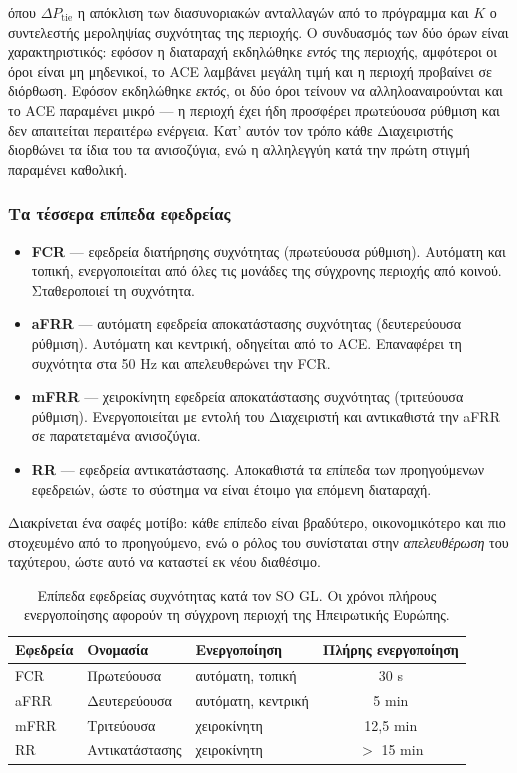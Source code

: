 όπου $\Delta P_{\mathrm{tie}}$ η απόκλιση των διασυνοριακών ανταλλαγών από το πρόγραμμα και
$K$ ο συντελεστής μεροληψίας συχνότητας της περιοχής. Ο συνδυασμός των δύο όρων είναι
χαρακτηριστικός: εφόσον η διαταραχή εκδηλώθηκε \emph{εντός} της περιοχής, αμφότεροι οι όροι
είναι μη μηδενικοί, το ACE λαμβάνει μεγάλη τιμή και η περιοχή προβαίνει σε διόρθωση.
Εφόσον εκδηλώθηκε \emph{εκτός}, οι δύο όροι τείνουν να αλληλοαναιρούνται και το ACE
παραμένει μικρό — η περιοχή έχει ήδη προσφέρει πρωτεύουσα ρύθμιση και δεν απαιτείται
περαιτέρω ενέργεια. Κατ' αυτόν τον τρόπο κάθε Διαχειριστής διορθώνει τα ίδια του τα
ανισοζύγια, ενώ η αλληλεγγύη κατά την πρώτη στιγμή παραμένει καθολική.

\subsubsection*{Τα τέσσερα επίπεδα εφεδρείας}

\begin{itemize}
\item \textbf{FCR} --- εφεδρεία διατήρησης συχνότητας (πρωτεύουσα ρύθμιση). Αυτόματη και
      τοπική, ενεργοποιείται από όλες τις μονάδες της σύγχρονης περιοχής από κοινού.
      Σταθεροποιεί τη συχνότητα.
\item \textbf{aFRR} --- αυτόματη εφεδρεία αποκατάστασης συχνότητας (δευτερεύουσα ρύθμιση).
      Αυτόματη και κεντρική, οδηγείται από το ACE. Επαναφέρει τη συχνότητα στα 50 Hz και
      απελευθερώνει την FCR.
\item \textbf{mFRR} --- χειροκίνητη εφεδρεία αποκατάστασης συχνότητας (τριτεύουσα ρύθμιση).
      Ενεργοποιείται με εντολή του Διαχειριστή και αντικαθιστά την aFRR σε παρατεταμένα
      ανισοζύγια.
\item \textbf{RR} --- εφεδρεία αντικατάστασης. Αποκαθιστά τα επίπεδα των προηγούμενων
      εφεδρειών, ώστε το σύστημα να είναι έτοιμο για επόμενη διαταραχή.
\end{itemize}

Διακρίνεται ένα σαφές μοτίβο: κάθε επίπεδο είναι βραδύτερο, οικονομικότερο και πιο
στοχευμένο από το προηγούμενο, ενώ ο ρόλος του συνίσταται στην \emph{απελευθέρωση} του
ταχύτερου, ώστε αυτό να καταστεί εκ νέου διαθέσιμο.

\begin{table}[!htbp]
\centering
\begin{tabular}{lllc}
\hline
Εφεδρεία & Ονομασία & Ενεργοποίηση & Πλήρης ενεργοποίηση \\
\hline
FCR  & Πρωτεύουσα   & αυτόματη, τοπική  & 30 s \\
aFRR & Δευτερεύουσα & αυτόματη, κεντρική & 5 min \\
mFRR & Τριτεύουσα   & χειροκίνητη        & 12,5 min \\
RR   & Αντικατάστασης & χειροκίνητη      & $>$ 15 min \\
\hline
\end{tabular}
\caption{Επίπεδα εφεδρείας συχνότητας κατά τον SO GL. Οι χρόνοι πλήρους ενεργοποίησης
αφορούν τη σύγχρονη περιοχή της Ηπειρωτικής Ευρώπης.}
\label{tab:reserves}
\end{table}

